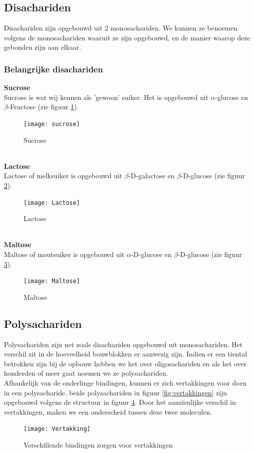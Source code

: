 \documentclass[a4paper,kul]{kulakarticle} %
\begin{document}
\subsection{Disachariden}
Disachariden zijn opgebouwd uit 2 monosachariden. We kunnen ze benoemen volgens de monosachariden waaruit ze zijn opgebouwd, en de manier waarop deze gebonden zijn aan elkaar.
\subsubsection{Belangrijke disachariden}
\textbf{Sucrose}\\
Sucrose is wat wij kennen als 'gewoon' suiker. Het is opgebouwd uit $\alpha$-glucose en $\beta$-Fructose (zie figuur \ref{fig:sucrose}).
\begin{figure}[h]
	\centering
	\texttt{[image: sucrose]}
	\caption[Sucrose]{Sucrose}
	\label{fig:sucrose}
\end{figure}\\
\textbf{Lactose}\\
Lactose of melksuiker is opgebouwd uit $\beta$-D-galactose en $\beta$-D-glucose (zie figuur \ref{fig:lactose}).
\begin{figure}[h]
	\centering
	\texttt{[image: Lactose]}
	\caption[Lactose]{Lactose}
	\label{fig:lactose}
\end{figure}\\ 
\newpage 	
\textbf{Maltose}\\
Maltose of moutsuiker is opgebouwd uit $\alpha$-D-glucose en $\beta$-D-glucose (zie figuur \ref{fig:maltose}).
\begin{figure}[h]
	\centering
	\texttt{[image: Maltose]}
	\caption[Maltose]{Maltose}
	\label{fig:maltose}
\end{figure}

\subsection{Polysachariden}
Polysachariden zijn net zoals disachariden opgebouwd uit monosachariden. Het verschil zit in de hoeveelheid bouwblokken er aanwezig zijn. Indien er een tiental betrokken zijn bij de opbouw hebben we het over oligosachariden en als het over honderden of meer gaat noemen we ze polysachariden.
\\
Afhankelijk van de onderlinge bindingen, kunnen er zich vertakkingen voor doen in een polysacharide. beide polysachariden in figuur \ref{fig:vertakkingen} zijn opgebouwd volgens de structuur in figuur \ref{fig:vertakking}. Door het aanzienlijke verschil in vertakkingen, maken we een onderscheid tussen deze twee moleculen.
\begin{figure}[h]
	\centering
	\texttt{[image: Vertakking]}
	\caption[Vertakking]{Verschillende bindingen zorgen voor vertakkingen}
	\label{fig:vertakking}
\end{figure}
\end{document}
